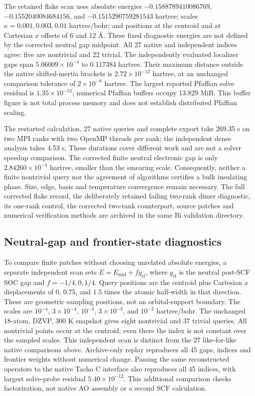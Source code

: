\documentclass[11pt]{article}
\begin{document}
The retained flake scan uses absolute energies
$-0.1588789410086769$, $-0.1552040084684156$, and
$-0.1515290759281543$ hartree; scales
$\kappa=0.001,0.003,0.01$ hartree/bohr; and positions at the
centroid and at Cartesian $x$ offsets of 6 and 12 \AA.
These fixed diagnostic energies are not defined by the corrected
neutral gap midpoint. All 27 native and independent indices agree:
five are nontrivial and 22 trivial. The independently evaluated
localizer gaps span $5.06009\times10^{-4}$ to 0.117384 hartree.
Their maximum distance outside the native shifted-inertia brackets
is $2.72\times10^{-12}$ hartree, at an unchanged comparison
tolerance of $2\times10^{-8}$ hartree. The largest reported
Pfaffian solve residual is $1.35\times10^{-13}$; numerical Pfaffian
buffers occupy 13.829 MiB. This buffer figure is not total process
memory and does not establish distributed Pfaffian scaling.

The restarted calculation, 27 native queries and complete export
take 269.35 s on two MPI ranks with two OpenMP threads per rank;
the independent dense analysis takes 4.53 s. These durations cover
different work and are not a solver speedup comparison. The
corrected finite neutral electronic gap is only
$2.84260\times10^{-4}$ hartree, smaller than the smearing scale.
Consequently, neither a finite nontrivial query nor the agreement
of algorithms certifies a bulk insulating phase. Size, edge,
basis and temperature convergence remain necessary.
The full corrected flake record, the deliberately retained failing
two-rank dimer diagnostic, its one-rank control, the corrected
two-rank counterpart, source patches and numerical verification
methods are archived in the same Bi validation directory.

\subsection{Neutral-gap and frontier-state diagnostics}
To compare finite patches without choosing unrelated absolute energies,
a separate independent scan sets
$E=E_{\mathrm{mid}}+f g_{\mathrm{el}}$, where $g_{\mathrm{el}}$ is
the neutral post-SCF SOC gap and $f=-1/4,0,1/4$. Query positions
are the centroid plus Cartesian $x$ displacements of $0$, $0.75$,
and $1.5$ times the atomic half-width in that direction. These are
geometric sampling positions, not an orbital-support boundary.
The scales are $10^{-4}$, $3\times10^{-4}$, $10^{-3}$,
$3\times10^{-3}$, and $10^{-2}$ hartree/bohr. The unchanged 18-atom,
DZVP, 300 K snapshot gives eight nontrivial and 37 trivial queries.
All nontrivial points occur at the centroid; even there the index
is not constant over the sampled scales. This independent scan is
distinct from the 27 like-for-like native comparisons above.
Archive-only replay reproduces all 45 gaps, indices and frontier
weights without numerical change. Passing the same reconstructed
operators to the native Tacho C interface also reproduces all 45
indices, with largest solve-probe residual $5.40\times10^{-12}$.
This additional comparison checks factorization, not native AO
assembly or a second SCF calculation.
\end{document}
